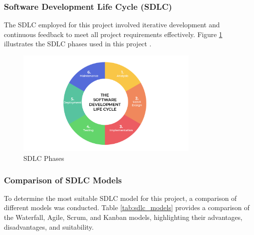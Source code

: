 \subsubsection{Software Development Life Cycle (SDLC)}
The SDLC employed for this project involved iterative development and continuous feedback to meet all project requirements effectively. Figure \ref{fig:SDLC Phases} illustrates the SDLC phases used in this project \cite{sdlc}.

\begin{figure}[H]
  \centering
  \includegraphics[width=0.8\textwidth]{Images/sdlc.png}
  \caption{SDLC Phases}
  \label{fig:SDLC Phases}
\end{figure}

\subsubsection{Comparison of SDLC Models}
To determine the most suitable SDLC model for this project, a comparison of different models was conducted. Table \ref{tab:sdlc_models} provides a comparison of the Waterfall, Agile, Scrum, and Kanban models, highlighting their advantages, disadvantages, and suitability.

